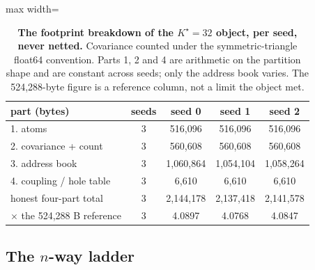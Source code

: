 \documentclass{article} %
\newcommand{\Kstar}{\ensuremath{K^{\star}}}
\begin{document}
\begin{table}[t]
\centering\small
\caption{\textbf{The footprint breakdown of the $\Kstar=32$ object, per seed, never netted.}
Covariance counted under the symmetric-triangle float64 convention. Parts 1, 2 and 4 are
arithmetic on the partition shape and are constant across seeds; only the address book varies.
The 524,288-byte figure is a reference column, not a limit the object met.}
\label{tab:ledger-kstar}
\begin{adjustbox}{max width=\linewidth}\begin{tabular}{lcccc}
\toprule
part (bytes) & seeds & seed 0 & seed 1 & seed 2 \\
\midrule
1. atoms & 3 & 516,096 & 516,096 & 516,096 \\
2. covariance + count & 3 & 560,608 & 560,608 & 560,608 \\
3. address book & 3 & 1,060,864 & 1,054,104 & 1,058,264 \\
4. coupling / hole table & 3 & 6,610 & 6,610 & 6,610 \\
honest four-part total & 3 & 2,144,178 & 2,137,418 & 2,141,578 \\
$\times$ the 524,288 B reference & 3 & 4.0897 & 4.0768 & 4.0847 \\ %
\bottomrule
\end{tabular}\end{adjustbox}
\end{table}

\subsection{The $n$-way ladder}
\label{sec:ladder}
\end{document}
